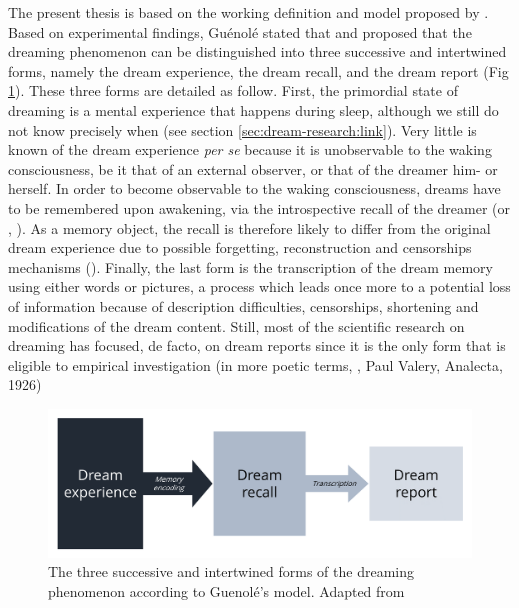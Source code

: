 The present thesis is based on the working definition and model proposed by \citet{guenole_a_2009}. Based on experimental findings, Guénolé stated that  and proposed that the dreaming phenomenon can be distinguished into three successive and intertwined forms, namely the dream experience, the dream recall, and the dream report (Fig \ref{fig:intro:guenole}). These three forms are detailed as follow. First, the primordial state of dreaming is a mental experience that happens during sleep, although we still do not know precisely when (see section \ref{sec:dream-research:link}). Very little is known of the dream experience \emph{per se} because it is unobservable to the waking consciousness, be it that of an external observer, or that of the dreamer him- or herself. In order to become observable to the waking consciousness, dreams have to be remembered upon awakening, via the introspective recall of the dreamer (or , \citealp{schwartz_dreaming:_2005}). As a memory object, the recall is therefore likely to differ from the original dream experience due to possible forgetting, reconstruction and censorships mechanisms (\cite{schwartz_sleep_2002, schwartz_dreaming:_2005}). Finally, the last form is the transcription of the dream memory using either words or pictures, a process which leads once more to a potential loss of information because of description difficulties, censorships, shortening and modifications of the dream content. Still, most of the scientific research on dreaming has focused, de facto, on dream reports since it is the only form that is eligible to empirical investigation (in more poetic terms, , Paul Valery, Analecta, 1926)

\begin{figure}[htb]
	\includegraphics[width=\textwidth]{Fig/Intro/Intro_Guenole/Intro_Guenole.png}
	\caption[Guénolé's model of dreaming]{The three successive and intertwined forms of the dreaming phenomenon according to Guenolé's model. Adapted from \citet{guenole_a_2009}}
	\label{fig:intro:guenole}
\end{figure}

